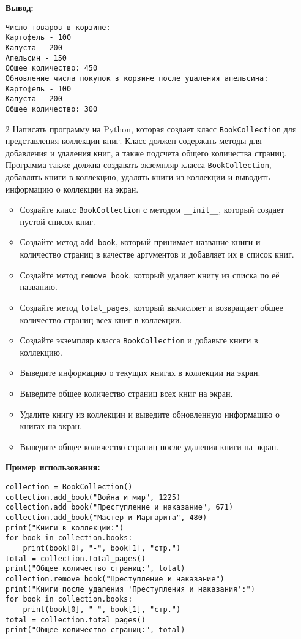 \begin{enumerate}
\textbf{Вывод:}
\begin{verbatim}
Число товаров в корзине:
Картофель - 100
Капуста - 200
Апельсин - 150
Общее количество: 450
Обновление числа покупок в корзине после удаления апельсина:
Картофель - 100
Капуста - 200
Общее количество: 300
\end{verbatim}

\item[2] Написать программу на Python, которая создает класс \texttt{BookCollection} для представления коллекции книг. Класс должен содержать методы для добавления и удаления книг, а также подсчета общего количества страниц. Программа также должна создавать экземпляр класса \texttt{BookCollection}, добавлять книги в коллекцию, удалять книги из коллекции и выводить информацию о коллекции на экран.

\begin{itemize}
    \item Создайте класс \texttt{BookCollection} с методом \texttt{\_\_init\_\_}, который создает пустой список книг.
    \item Создайте метод \texttt{add\_book}, который принимает название книги и количество страниц в качестве аргументов и добавляет их в список книг.
    \item Создайте метод \texttt{remove\_book}, который удаляет книгу из списка по её названию.
    \item Создайте метод \texttt{total\_pages}, который вычисляет и возвращает общее количество страниц всех книг в коллекции.
    \item Создайте экземпляр класса \texttt{BookCollection} и добавьте книги в коллекцию.
    \item Выведите информацию о текущих книгах в коллекции на экран.
    \item Выведите общее количество страниц всех книг на экран.
    \item Удалите книгу из коллекции и выведите обновленную информацию о книгах на экран.
    \item Выведите общее количество страниц после удаления книги на экран.
\end{itemize}

\textbf{Пример использования:}

\begin{verbatim}
collection = BookCollection()
collection.add_book("Война и мир", 1225)
collection.add_book("Преступление и наказание", 671)
collection.add_book("Мастер и Маргарита", 480)
print("Книги в коллекции:")
for book in collection.books:
    print(book[0], "-", book[1], "стр.")
total = collection.total_pages()
print("Общее количество страниц:", total)
collection.remove_book("Преступление и наказание")
print("Книги после удаления 'Преступления и наказания':")
for book in collection.books:
    print(book[0], "-", book[1], "стр.")
total = collection.total_pages()
print("Общее количество страниц:", total)
\end{verbatim}


\end{enumerate}
